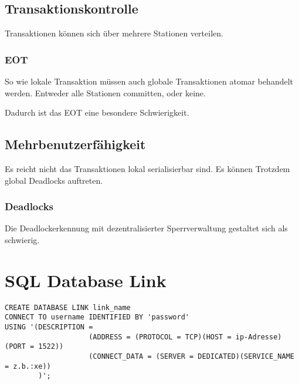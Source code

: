 \subsection{Transaktionskontrolle}

Transaktionen können sich über mehrere Stationen verteilen. 

\subsubsection{EOT}

So wie lokale Transaktion müssen auch globale Transaktionen atomar behandelt werden. Entweder alle Stationen committen, oder keine.

Dadurch ist das EOT eine besondere Schwierigkeit.

\subsection{Mehrbenutzerfähigkeit}

Es reicht nicht das Transaktionen lokal serialisierbar sind. Es können Trotzdem global Deadlocks auftreten.

\subsubsection{Deadlocks}

Die Deadlockerkennung mit dezentralisierter Sperrverwaltung gestaltet sich als schwierig.

\section{SQL Database Link}

\begin{lstlisting}
CREATE DATABASE LINK link_name
CONNECT TO username IDENTIFIED BY 'password'
USING '(DESCRIPTION =
                    (ADDRESS = (PROTOCOL = TCP)(HOST = ip-Adresse)(PORT = 1522))
                    (CONNECT_DATA = (SERVER = DEDICATED)(SERVICE_NAME = z.b.:xe))
        )';
\end{lstlisting}